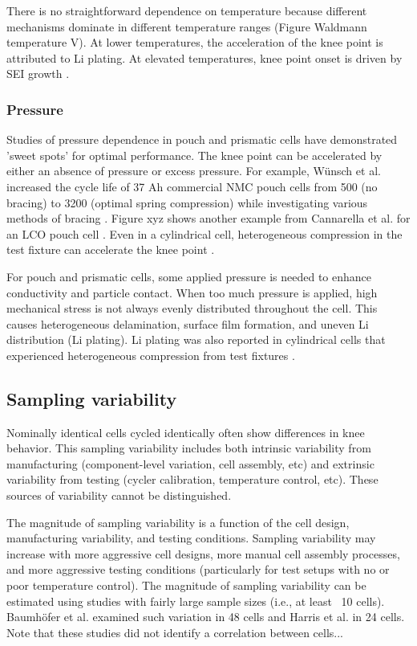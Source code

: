 \documentclass{article}
\begin{document}
There is no straightforward dependence on temperature because different mechanisms dominate in different temperature ranges (Figure Waldmann temperature V). At lower temperatures, the acceleration of the knee point is attributed to Li plating. At elevated temperatures, knee point onset is driven by SEI growth \cite {zhang_accelerated_2019,schuster_nonlinear_2015,waldmann_temperature_2014,waldmann_optimization_2015}.

\subsubsection{Pressure}
Studies of pressure dependence in pouch and prismatic cells have demonstrated 'sweet spots' for optimal performance. The knee point can be accelerated by either an absence of pressure or excess pressure. For example, Wünsch et al. increased the cycle life of 37 Ah commercial NMC pouch cells from 500 (no bracing) to 3200 (optimal spring compression) while investigating various methods of bracing \cite{wunsch_investigation_2019}. Figure xyz shows another example from Cannarella et al. for an LCO pouch cell \cite{cannarella_stress_2014}. Even in a cylindrical cell, heterogeneous compression in the test fixture can accelerate the knee point \cite{bach_nonlinear_2016}. 

For pouch and prismatic cells, some applied pressure is needed to enhance conductivity and particle contact. When too much pressure is applied, high mechanical stress is not always evenly distributed throughout the cell. This causes heterogeneous delamination, surface film formation, and uneven Li distribution (Li plating). Li plating was also reported in cylindrical cells that experienced heterogeneous compression from test fixtures \cite{bach_nonlinear_2016}. 



\subsection{Sampling variability}

Nominally identical cells cycled identically often show differences in knee behavior. This sampling variability includes both intrinsic variability from manufacturing (component-level variation, cell assembly, etc) and extrinsic variability from testing (cycler calibration, temperature control, etc). These sources of variability cannot be distinguished.

The magnitude of sampling variability is a function of the cell design, manufacturing variability, and testing conditions. Sampling variability may increase with more aggressive cell designs, more manual cell assembly processes, and more aggressive testing conditions (particularly for test setups with no or poor temperature control). The magnitude of sampling variability can be estimated using studies with fairly large sample sizes (i.e., at least ~10 cells). Baumhöfer et al.\cite{baumhofer_production_2014} examined such variation in 48 cells and Harris et al.\cite{harris_failure_2017} in 24 cells. Note that these studies did not identify a correlation between cells...
\end{document}
